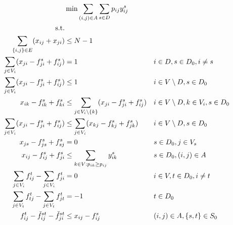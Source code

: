  	
 	\begin{small} 	
\begin{subequations}
\begin{flalign}
\label{objective:mfinpf2} &\makebox[0pt][l]{$\displaystyle{}\min \sum\limits_{(i,j) \in A} \sum\limits_{s \in D} p_{ij} y^s_{ij} $}  & &&\\ \notag  
   \text{s.t.}&  &  &                 && \\	\
\label{con:mfinpf2:maxsize}   \sum\limits_{\{i,j\}\in E}(x_{ij}+x_{ji}) & \leq  N-1  &   && \\
     \label{con:mfinpf2:arrowFromDest}  \sum\limits_{j\in V_i}(x_{ji}-f^s_{ji}+f^s_{ij})          & = 1       			&& i\in D, s\in D_0, i \neq s && \\ 
		  \label{con:mfinpf2:arrowFromNonDestB}  \sum\limits_{j \in V_i}(x_{ji}-f^s_{ji}+f^s_{ij})  &\leq 1 && i\in V \setminus D, s\in D_0   &&\\		
		  \label{con:mfinpf2:arrowFromNonDestA}  x_{ik}-f^s_{ik}+f^s_{ki}  & \leq \sum\limits_{j \in V_i\setminus\{k\}}(x_{ji}-f^s_{ji}+f^s_{ij}) &&
		  i\in V \setminus D,k\in V_i, s\in D_0   &&\\		  
      \label{con:mfinpf2:extraCon}  \sum\limits_{j \in V_i}(x_{ji}-f^s_{ji}+f^s_{ij}) & \leq \sum\limits_{j \in V_i}(x_{kj}-f^s_{kj}+f^s_{jk}) &&  i\in V\setminus D, s\in D_0  &&\\			  \label{con:mfinpf2:startInSource}  x_{js} - f^s_{js}+f^s_{sj}    & = 0       			&&  s\in D_0, j\in V_s &&\\		 
		  \label{con:mfinpf2:yvar}  x_{ij}-f^s_{ij}+f^s_{ji} & \leq \sum\limits_{k\in V:p_{ik}\geq p_{ij}}y^s_{ik} && s\in D_0, (i,j)\in A 		&&\\  
		 		 \label{con:mfinpf2:flowNormal}  \sum\limits_{\substack{ j\in V_i }}f^t_{ij}-\sum\limits_{\substack{j\in V_i }}f^t_{ji}    & = 0     			&& i\in V, t\in D_0, i \neq t &&\\	
		 	 \label{con:mfinpf2:flowDest}  \sum\limits_{\substack{j\in V_t}}f^t_{tj}-\sum\limits_{\substack{j\in V_t}}f^t_{jt}    & = -1     			&&  t \in D_0 &&\\	
           \label{con:mfinpf2:fcap}   f^t_{ij} - \check{f}^{st}_{ij} - \check{f}^{st}_{ji} &\leq  x_{ij}-f^s_{ij}   && (i,j)\in A, \{s,t\}\in S_0 && &\\ 		 			 	 

\end{flalign}
\end{subequations}
\end{small}
